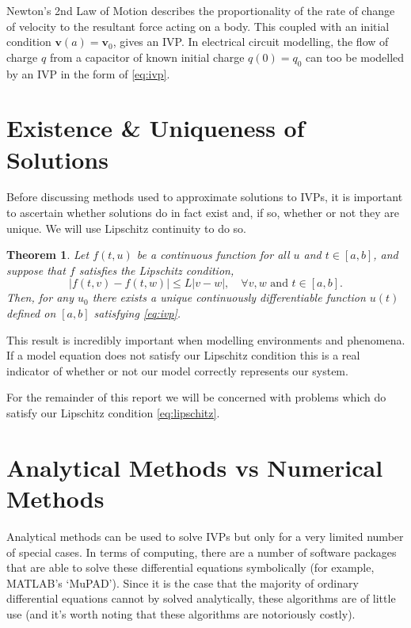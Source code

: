 \documentclass[12pt, twoside]{report}
\theoremstyle{plain}
\newtheorem{theorem}{Theorem}[chapter]
\theoremstyle{definition}
\theoremstyle{definition}
\providecommand{\abs}[1]{\lvert#1\rvert}
\begin{document}
        Newton's 2nd Law of Motion describes the proportionality of the rate 
        of change of velocity to the resultant force acting on a body. This 
        coupled with an initial condition $\mathbf{v}(a)=\mathbf{v}_0$, gives
        an IVP. In electrical circuit modelling, the flow of charge $q$ from a
        capacitor of known initial charge $q(0)=q_0$ can too be modelled by an 
        IVP in the form of \eqref{eq:ivp}.


    \section{Existence \& Uniqueness of Solutions}
    \label{1_existence}
        Before discussing methods used to approximate solutions to IVPs, it is
        important to ascertain whether solutions do in fact exist and, if so,
        whether or not they are unique. We will use Lipschitz continuity to do
        so.
        \begin{theorem}
        \label{1_existence_uniqueness}
            Let $f(t,u)$ be a continuous function for all $u$ and $t \in 
            [a, b]$, and suppose that $f$ satisfies the Lipschitz condition,
            \begin{equation}
            \label{eq:lipschitz}
                \abs{f(t,v)-f(t,w)} \le L\abs{v-w},
                \quad \forall v, w \text{ and } t \in [a,b].
            \end{equation}
            Then, for any $u_0$ there exists a unique continuously
            differentiable function $u(t)$ defined on $[a,b]$ satisfying
            \eqref{eq:ivp}.
        \end{theorem}
        This result is incredibly important when modelling environments and 
        phenomena. If a model equation does not satisfy our Lipschitz condition
        this is a real indicator of whether or not our model correctly 
        represents our system.

        For the remainder of this report we will be concerned with problems 
        which do satisfy our Lipschitz condition \eqref{eq:lipschitz}.


    \section{Analytical Methods vs Numerical Methods}
    \label{1_analytical_numerical}
        Analytical methods can be used to solve IVPs but only for a very limited
        number of special cases. In terms of computing, there are a number of 
        software packages that are able to solve these differential equations
        symbolically (for example, MATLAB's `MuPAD'). Since it is the case that
        the majority of ordinary differential equations cannot by solved 
        analytically, these algorithms are of little use (and it's worth noting
        that these algorithms are notoriously costly).
\end{document}
